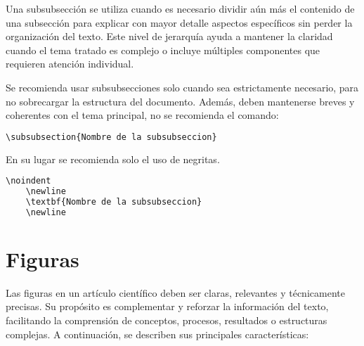 \documentclass[12pt]{difu100cia} %
\begin{document}
Una subsubsección se utiliza cuando es necesario dividir aún más el contenido de una subsección para explicar con mayor detalle aspectos específicos sin perder la organización del texto. Este nivel de jerarquía ayuda a mantener la claridad cuando el tema tratado es complejo o incluye múltiples componentes que requieren atención individual.

Se recomienda usar subsubsecciones solo cuando sea estrictamente necesario, para no sobrecargar la estructura del documento. Además, deben mantenerse breves y coherentes con el tema principal, no se recomienda el comando:

\begin{lstlisting}[language=bash]
    \subsubsection{Nombre de la subsubseccion} 
\end{lstlisting}

En su lugar se recomienda solo el uso de negritas.

\begin{lstlisting}[language=bash]
    \noindent
    \newline
    \textbf{Nombre de la subsubseccion}
    \newline
\end{lstlisting}

\section{Figuras}

Las figuras en un artículo científico deben ser claras, relevantes y técnicamente precisas. Su propósito es complementar y reforzar la información del texto, facilitando la comprensión de conceptos, procesos, resultados o estructuras complejas. A continuación, se describen sus principales características:
\end{document}
